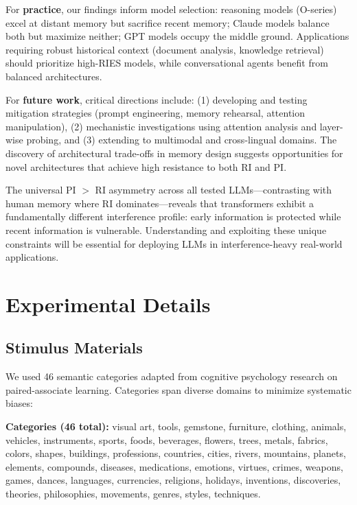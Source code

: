 \documentclass{article}
\begin{document}
For \textbf{practice}, our findings inform model selection: reasoning models (O-series) excel at distant memory but sacrifice recent memory; Claude models balance both but maximize neither; GPT models occupy the middle ground. Applications requiring robust historical context (document analysis, knowledge retrieval) should prioritize high-RIES models, while conversational agents benefit from balanced architectures.

For \textbf{future work}, critical directions include: (1) developing and testing mitigation strategies (prompt engineering, memory rehearsal, attention manipulation), (2) mechanistic investigations using attention analysis and layer-wise probing, and (3) extending to multimodal and cross-lingual domains. The discovery of architectural trade-offs in memory design suggests opportunities for novel architectures that achieve high resistance to both RI and PI.

The universal PI $>$ RI asymmetry across all tested LLMs---contrasting with human memory where RI dominates---reveals that transformers exhibit a fundamentally different interference profile: early information is protected while recent information is vulnerable. Understanding and exploiting these unique constraints will be essential for deploying LLMs in interference-heavy real-world applications.

\newpage
\appendix

\section{Experimental Details}
\label{appendix:experimental}

\subsection{Stimulus Materials}

We used 46 semantic categories adapted from cognitive psychology research on paired-associate learning. Categories span diverse domains to minimize systematic biases:

\textbf{Categories (46 total):} visual art, tools, gemstone, furniture, clothing, animals, vehicles, instruments, sports, foods, beverages, flowers, trees, metals, fabrics, colors, shapes, buildings, professions, countries, cities, rivers, mountains, planets, elements, compounds, diseases, medications, emotions, virtues, crimes, weapons, games, dances, languages, currencies, religions, holidays, inventions, discoveries, theories, philosophies, movements, genres, styles, techniques.
\end{document}

